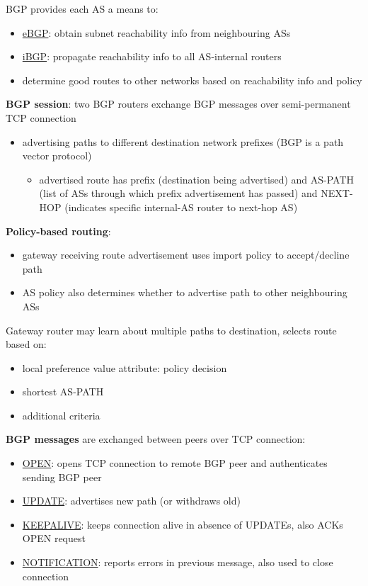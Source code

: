 \documentclass[11pt]{article}
\begin{document}
BGP provides each AS a means to:
\begin{itemize}
\item \uline{eBGP}: obtain subnet reachability info from neighbouring ASs
\item \uline{iBGP}: propagate reachability info to all AS-internal routers
\item determine good routes to other networks based on reachability info and policy
\end{itemize}

\textbf{BGP session}: two BGP routers exchange BGP messages over semi-permanent TCP connection
\begin{itemize}
\item advertising paths to different destination network prefixes (BGP is a path vector protocol)
\begin{itemize}
\item advertised route has prefix (destination being advertised) and AS-PATH (list of ASs through
which prefix advertisement has passed) and NEXT-HOP (indicates specific internal-AS router
to next-hop AS)
\end{itemize}
\end{itemize}

\textbf{Policy-based routing}:
\begin{itemize}
\item gateway receiving route advertisement uses import policy to accept/decline path
\item AS policy also determines whether to advertise path to other neighbouring ASs
\end{itemize}

Gateway router may learn about multiple paths to destination, selects route based on:
\begin{itemize}
\item local preference value attribute: policy decision
\item shortest AS-PATH
\item additional criteria
\end{itemize}

\textbf{BGP messages} are exchanged between peers over TCP connection:
\begin{itemize}
\item \uline{OPEN}: opens TCP connection to remote BGP peer and authenticates sending BGP peer
\item \uline{UPDATE}: advertises new path (or withdraws old)
\item \uline{KEEPALIVE}: keeps connection alive in absence of UPDATEs, also ACKs OPEN request
\item \uline{NOTIFICATION}: reports errors in previous message, also used to close connection
\end{itemize}
\end{document}
